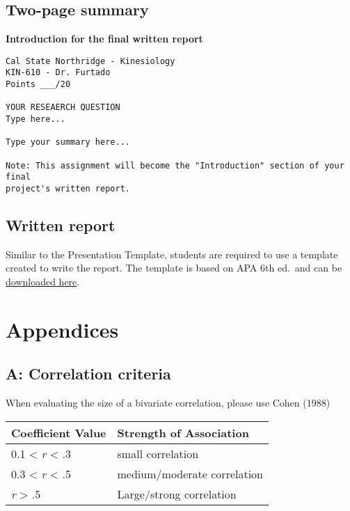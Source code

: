 \documentclass[
]{article}
\begin{document}
\hypertarget{two-page-summary}{%
\subsection{Two-page summary}\label{two-page-summary}}

\textbf{Introduction for the final written report}

\begin{verbatim}
Cal State Northridge - Kinesiology
KIN-610 - Dr. Furtado
Points ___/20

YOUR RESEAERCH QUESTION
Type here...

Type your summary here...

Note: This assignment will become the "Introduction" section of your final 
project's written report.
\end{verbatim}

\hypertarget{written-report-1}{%
\subsection{Written report}\label{written-report-1}}

Similar to the Presentation Template, students are required to use a template created to write the report. The template is based on APA 6th ed.~and can be \href{project-template.docx}{downloaded here}.

\hypertarget{appendices}{%
\section{Appendices}\label{appendices}}

\hypertarget{appendix-a}{%
\subsection{A: Correlation criteria}\label{appendix-a}}

When evaluating the size of a bivariate correlation, please use Cohen (1988)

\begin{longtable}[]{@{}ll@{}}
\toprule()
Coefficient Value & Strength of Association \\
\midrule()
\endhead
0.1 \textless{} \emph{r} \textless{} .3 & small correlation \\
0.3 \textless{} \emph{r} \textless{} .5 & medium/moderate correlation \\
\emph{r} \textgreater{} .5 & Large/strong correlation \\
\bottomrule()
\end{longtable}
\end{document}

